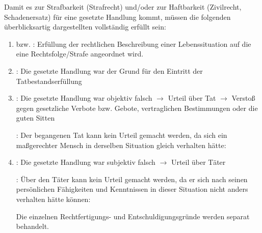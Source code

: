 {Damit es zur Strafbarkeit
(Strafrecht) und/oder zur Haftbarkeit (Zivilrecht, Schadenersatz) für eine
gesetzte Handlung kommt, müssen die folgenden
überblicksartig dargestellten 
vollständig erfüllt sein:

\begin{enumerate}
  \item {} bzw. :
  Erfüllung der rechtlichen Beschreibung einer
  Lebenssituation auf die eine Rechtsfolge/Strafe angeordnet
  wird.
  \item {}: Die gesetzte Handlung war der Grund
  für den Eintritt der Tatbestandserfüllung
  \item {}: Die gesetzte Handlung war
  objektiv falsch ${\rightarrow}$ Urteil über Tat
  ${\rightarrow}$ Verstoß gegen gesetzliche Verbote bzw.
  Gebote, vertraglichen Bestimmungen oder die guten Sitten
  
  :  Der begangenen Tat kann kein
  Urteil gemacht werden, da sich ein maßgerechter Mensch in 
  derselben Situation gleich verhalten
  hätte:
  \item {}: Die gesetzte Handlung war
  subjektiv falsch ${\rightarrow}$ Urteil über
  Täter
  
  : Über den Täter kann kein
  Urteil gemacht werden, da er sich nach seinen persönlichen
  Fähigkeiten und Kenntnissen in dieser Situation nicht
  anders verhalten hätte können:
  
  Die einzelnen Rechtfertigungs- und Entschuldigungsgründe
  werden separat behandelt.
  
\end{enumerate}

}
